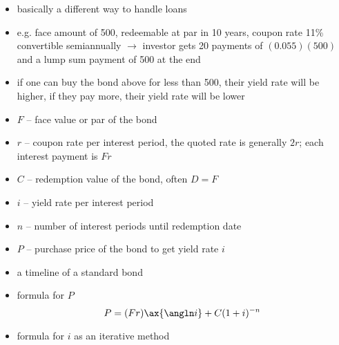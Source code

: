 \documentclass[../00_main.tex]{subfiles}
\begin{document}
\begin{itemize}
    \item basically a different way to handle loans
    \item e.g. face amount of 500, redeemable at par in 10 years, coupon rate 
        11\% convertible semiannually $\rightarrow$ investor gets 20 payments
        of $(0.055)(500)$ and a lump sum payment of 500 at the end
    \item if one can buy the bond above for less than 500, their yield rate 
        will be higher, if they pay more, their yield rate will be lower
    \item $F$ -- face value or par of the bond
    \item $r$ -- coupon rate per interest period, the quoted rate is generally
        $2r$; each interest payment is $Fr$
    \item $C$ -- redemption value of the bond, often $D=F$
    \item $i$ -- yield rate per interest period
    \item $n$ -- number of interest periods until redemption date
    \item $P$ -- purchase price of the bond to get yield rate $i$
    \item a timeline of a standard bond
    \begin{center}
    \end{center}
    \item formula for $P$
        \begin{equation}\nonumber
            P = (Fr)\ax{\angln i} + C(1+i)^{-n}
        \end{equation}
    \item formula for $i$ as an iterative method

\end{itemize}
\end{document}
